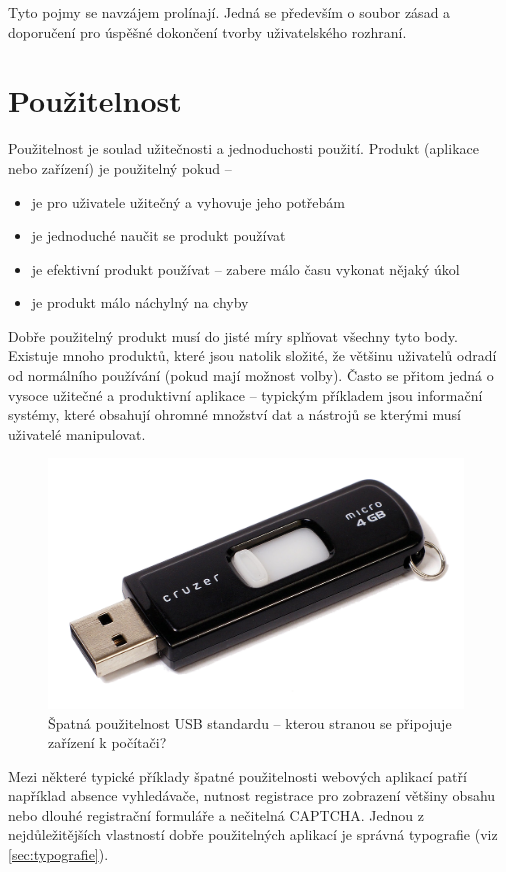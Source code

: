 Tyto pojmy se navzájem prolínají. Jedná se především o soubor zásad a doporučení pro úspěšné dokončení tvorby uživatelského rozhraní.

\section{Použitelnost}
\label{sec:usability}

Použitelnost je soulad užitečnosti a jednoduchosti použití. Produkt (aplikace nebo zařízení) je použitelný pokud --

\begin{itemize}
    \item je pro uživatele užitečný a vyhovuje jeho potřebám
    \item je jednoduché naučit se produkt používat
    \item je efektivní produkt používat -- zabere málo času vykonat nějaký úkol
    \item je produkt málo náchylný na chyby
\end{itemize}

Dobře použitelný produkt musí do jisté míry splňovat všechny tyto body. Existuje mnoho produktů, které jsou natolik složité, že většinu uživatelů odradí od normálního používání (pokud mají možnost volby). Často se přitom jedná o vysoce užitečné a produktivní aplikace -- typickým příkladem jsou informační systémy, které obsahují ohromné množství dat a nástrojů se kterými musí uživatelé manipulovat.

\begin{figure}[htbp]
    \centering
    \includegraphics[width=11cm]{images/usb-fail.png}
    \caption{Špatná použitelnost USB standardu -- kterou stranou se připojuje zařízení k počítači?}
\end{figure}

Mezi některé typické příklady špatné použitelnosti webových aplikací patří například absence vyhledávače, nutnost registrace pro zobrazení většiny obsahu nebo dlouhé registrační formuláře a nečitelná CAPTCHA. Jednou z nejdůležitějších vlastností dobře použitelných aplikací je správná typografie (viz \ref{sec:typografie}).

